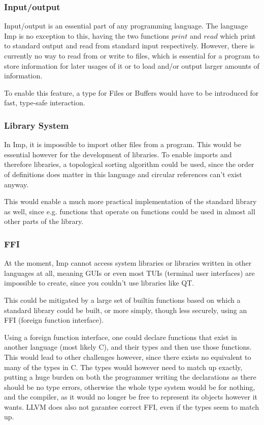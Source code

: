 \documentclass[12pt]{article}
\begin{document}
\subsubsection{Input/output}
Input/output is an essential part of any programming language.
The language Imp is no exception to this, having the two functions
$print$ and $read$ which print to standard output and read from
standard input respectively. However, there is currently no way
to read from or write to files, which is essential for a program
to store information for later usages of it or to load and/or output larger
amounts of information.

To enable this feature, a type for Files or Buffers would have to be
introduced for fast, type-safe interaction.

\subsubsection{Library System}
In Imp, it is impossible to import other files from a program.
This would be essential however for the development of libraries.
To enable imports and therefore libraries, a topological sorting
algorithm could be used, since the order of definitions does
matter in this language and circular references can't exist anyway.

This would enable a much more practical implementation of the standard
library as well, since e.g. functions that operate on functions could be used
in almost all other parts of the library.

\subsubsection{FFI}
At the moment, Imp cannot access system libraries or libraries
written in other languages at all, meaning GUIs or even most TUIs
(terminal user interfaces) are impossible to create,
since you couldn't use libraries like QT.

This could be mitigated by a large set of builtin functions based
on which a standard library could be built, or more simply, though
less securely, using an FFI (foreign function interface).

Using a foreign function interface, one could declare functions that
exist in another language (most likely C), and their types and then use
those functions. This would lead to other challenges however, since
there exists no equivalent to many of the types in C.
The types would however need to match up exactly,
putting a huge burden on both the programmer writing the declarations
as there should be no type errors, otherwise the whole type system
would be for nothing, and the compiler, as it would no longer
be free to represent its objects however it wants.
LLVM does also not garantee correct FFI, even if the types
seem to match up.
\end{document}
